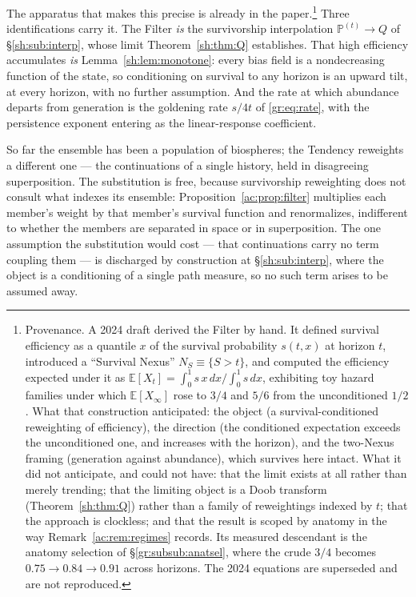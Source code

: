 \documentclass[11pt]{article}
\numberwithin{equation}{section}
\theoremstyle{plain}
\theoremstyle{definition}
\theoremstyle{remark}
\newcommand{\E}{\mathbb{E}}
\newcommand{\PP}{\mathbb{P}}
\begin{document}
The apparatus that makes this precise is already in the paper.\footnote{Provenance. A 2024 draft derived the Filter by hand. It defined survival efficiency as a quantile $x$ of the survival probability $s(t,x)$ at horizon $t$, introduced a ``Survival Nexus'' $N_S \equiv \{S > t\}$, and computed the efficiency expected under it as $\E[X_t] = \int_0^1 s\,x\,dx \big/ \int_0^1 s\,dx$, exhibiting toy hazard families under which $\E[X_\infty]$ rose to $3/4$ and $5/6$ from the unconditioned $1/2$. What that construction anticipated: the object (a survival-conditioned reweighting of efficiency), the direction (the conditioned expectation exceeds the unconditioned one, and increases with the horizon), and the two-Nexus framing (generation against abundance), which survives here intact. What it did not anticipate, and could not have: that the limit exists at all rather than merely trending; that the limiting object is a Doob transform (Theorem~\ref{sh:thm:Q}) rather than a family of reweightings indexed by $t$; that the approach is clockless; and that the result is scoped by anatomy in the way Remark~\ref{ac:rem:regimes} records. Its measured descendant is the anatomy selection of \S\ref{gr:subsub:anatsel}, where the crude $3/4$ becomes $0.75 \to 0.84 \to 0.91$ across horizons. The 2024 equations are superseded and are not reproduced.}
Three identifications carry it. The Filter \emph{is} the survivorship interpolation $\PP^{(t)} \to Q$ of \S\ref{sh:sub:interp}, whose limit Theorem~\ref{sh:thm:Q} establishes. That high efficiency accumulates \emph{is} Lemma~\ref{sh:lem:monotone}: every bias field is a nondecreasing function of the state, so conditioning on survival to any horizon is an upward tilt, at every horizon, with no further assumption. And the rate at which abundance departs from generation is the goldening rate $s/4t$ of \eqref{gr:eq:rate}, with the persistence exponent entering as the linear-response coefficient.

So far the ensemble has been a population of biospheres; the Tendency reweights a different one --- the continuations of a single history, held in disagreeing superposition. The substitution is free, because survivorship reweighting does not consult what indexes its ensemble: Proposition~\ref{ac:prop:filter} multiplies each member's weight by that member's survival function and renormalizes, indifferent to whether the members are separated in space or in superposition. The one assumption the substitution would cost --- that continuations carry no term coupling them --- is discharged by construction at \S\ref{sh:sub:interp}, where the object is a conditioning of a single path measure, so no such term arises to be assumed away.
\end{document}
